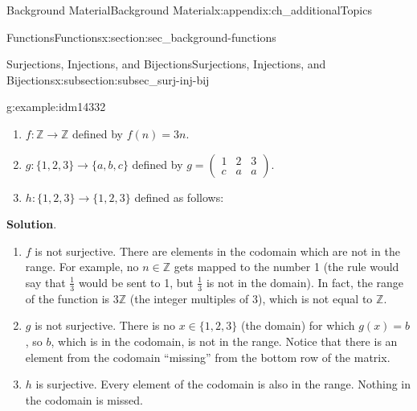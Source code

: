 \documentclass[oneside,10pt,]{book}
\numberwithin{equation}{chapter}
\def\Z{\mathbb Z}
\newcommand{\amp}{&}
\begin{document}
\begin{appendixptx}{Background Material}{}{Background Material}{}{}{x:appendix:ch_additionalTopics}
\begin{sectionptx}{Functions}{}{Functions}{}{}{x:section:sec_background-functions}
\begin{subsectionptx}{Surjections, Injections, and Bijections}{}{Surjections, Injections, and Bijections}{}{}{x:subsection:subsec_surj-inj-bij}
\begin{example}{}{g:example:idm14332}
\par
%
\begin{enumerate}
\item{}\(f:\Z \to \Z\) defined by \(f(n) = 3n\).%
\item{}\(g: \{1,2,3\} \to \{a,b,c\}\) defined by \(g = \begin{pmatrix}1 \amp 2 \amp 3 \\ c \amp a \amp a \end{pmatrix}\).%
\item{}\(h:\{1,2,3\} \to \{1,2,3\}\) defined as follows:%
\begin{sidebyside}{1}{0.4}{0.4}{0}%
\begin{sbspanel}{0.2}%
%
\end{sbspanel}%
\end{sidebyside}%
\end{enumerate}
%
\par\smallskip%
\noindent\textbf{Solution}.\hypertarget{g:solution:idm14349}{}\quad{}%
\begin{enumerate}
\item{}\(f\) is not surjective. There are elements in the codomain which are not in the range. For example, no \(n \in \Z\) gets mapped to the number 1 (the rule would say that \(\frac{1}{3}\) would be sent to 1, but \(\frac{1}{3}\) is not in the domain). In fact, the range of the function is \(3\Z\) (the integer multiples of 3), which is not equal to \(\Z\).%
\item{}\(g\) is not surjective. There is no \(x \in \{1,2,3\}\) (the domain) for which \(g(x) = b\), so \(b\), which is in the codomain, is not in the range. Notice that there is an element from the codomain ``missing'' from the bottom row of the matrix.%
\item{}\(h\) is surjective. Every element of the codomain is also in the range. Nothing in the codomain is missed.%
\end{enumerate}
%
\end{example}

\end{subsectionptx}
\end{sectionptx}
\end{appendixptx}
\end{document}
